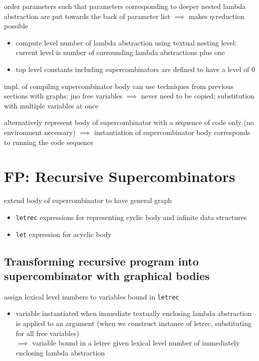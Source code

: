 \documentclass[8pt]{extarticle}
\begin{document}
\begin{multicols*}{2}
order parameters such that parameters corresponding to deeper nested lambda abstraction are put towards the back of parameter list $\implies$ makes $\eta$-reduction possible
\begin{itemize}
\item compute level number of lambda abstraction using textual nesting level: current level is number of surrounding lambda abstractions plus one
\item top level constants including supercombinators are defined to have a level of 0
\end{itemize}

impl. of compiling supercombinator body can use techniques from previous sections with graphs; jno free variables $\implies$ never need to be copied; substitution with multiple variables at once

alternatively represent body of supercombinator with a sequence of code only (no environment necessary) $\implies$ instantiation of supercombinator body corresponds to running the code sequence

\vfill\null
\columnbreak

\section{FP: Recursive Supercombinators}

extend body of supercombinator to have general graph

\begin{itemize}
\item \verb|letrec| expressions for representing cyclic body and infinite data structures
\item \verb|let| expression for acyclic body
\end{itemize}

\subsection{Transforming recursive program into supercombinator with graphical bodies}

assign lexical level numbers to variables bound in \verb|letrec|
\begin{itemize}
\item variable instantiated when immediate textually enclosing lambda abstraction is applied to an argument (when we construct instance of letrec, substituting for all free variables)\\
  $\implies$ variable bound in a letrec given lexical level number of immediately enclosing lambda abstraction


\end{itemize}
\end{multicols*}
\end{document}
